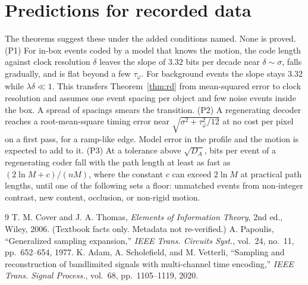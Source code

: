 \documentclass[10pt]{article}
\theoremstyle{remark}
\newcommand{\tphi}{\tau_\varphi}
\begin{document}
\section{Predictions for recorded data}
The theorems suggest these under the added conditions named. None is proved.
(P1) For in-box events coded by a model that knows the motion, the code length against clock
resolution $\delta$ leaves the slope of $3.32$ bits per decade near $\delta\sim\sigma$, falls gradually, and
is flat beyond a few $\tphi$. For background events the slope stays $3.32$ while
$\lambda\delta\ll1$. This transfers Theorem~\ref{thm:rd} from mean-squared error to clock
resolution and assumes one event spacing per object and few noise events inside the box. A spread of spacings smears the transition.
(P2) A regenerating decoder reaches a root-mean-square timing error near
$\sqrt{\sigma^2+\tphi^2/12}$ at no cost per pixel on a first pass, for a ramp-like edge. Model error
in the profile and the motion is expected to add to it.
(P3) At a tolerance above $\sqrt{D_A}$, bits per event of a regenerating coder fall with the path
length at least as fast as $(2\ln M+c)/(nM)$, where the constant $c$ can exceed $2\ln M$ at
practical path lengths, until one of the following sets a floor: unmatched events from non-integer
contrast, new content, occlusion, or non-rigid motion.

\begin{thebibliography}{9}
 T. M. Cover and J. A. Thomas, \emph{Elements of Information Theory}, 2nd ed.,
Wiley, 2006. (Textbook facts only. Metadata not re-verified.)
 A. Papoulis, ``Generalized sampling expansion,'' \emph{IEEE Trans. Circuits
Syst.}, vol.~24, no.~11, pp.~652--654, 1977.
 K. Adam, A. Scholefield, and M. Vetterli, ``Sampling and reconstruction of
bandlimited signals with multi-channel time encoding,'' \emph{IEEE Trans. Signal Process.},
vol.~68, pp.~1105--1119, 2020.
\end{thebibliography}
\end{document}
